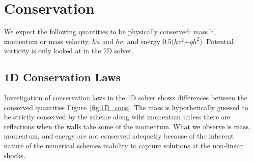 \section{Conservation}

We expect the following quantities to be physically conserved: mass h, momentum or mass velocity, $hu$ and $hv$, and
energy 0.5($hv^2$+$gh^2$). Potential vorticity is only looked at in the 2D solver. 

\subsection{1D Conservation Laws}
Investigation of conservation laws in the 1D solver shows differences
between the conserved quantities Figure~\ref{fig:1D_cons}. The mass is hypothetically guessed to be strictly conserved by the scheme along wiht 
momentum unless there are reflections when the walls take some of the momentum. What we observe is mass, momentum, and energy are not conserved 
adequetly because of the inherent nature of the numerical schemes inability to capture solutions at the non-linear shocks.  
\newline

